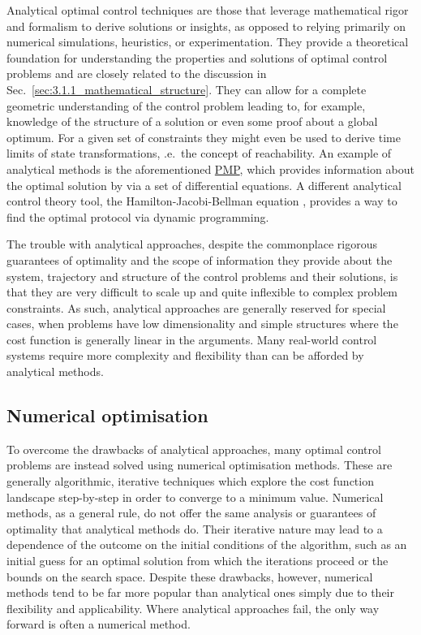 \documentclass[a4paper,oneside,11pt]{book}
\newcommand{\acrref}[1]{\hyperref[acr:#1]{#1}}
\begin{document}
Analytical optimal control techniques are those that leverage mathematical rigor and formalism to derive solutions or insights, as opposed to relying primarily on numerical simulations, heuristics, or experimentation. They provide a theoretical foundation for understanding the properties and solutions of optimal control problems and are closely related to the discussion in Sec.~\ref{sec:3.1.1_mathematical_structure}. They can allow for a complete geometric understanding of the control problem leading to, for example, knowledge of the structure of a solution or even some proof about a global optimum. For a given set of constraints they might even be used to derive time limits of state transformations, \@i.e.~the concept of reachability. An example of analytical methods is the aforementioned \acrref{PMP}, which provides information about the optimal solution by via a set of differential equations. A different analytical control theory tool, the Hamilton-Jacobi-Bellman equation \cite{yong_dynamic_1999}, provides a way to find the optimal protocol via dynamic programming\cite{sniedovich_dynamic_2010}.

The trouble with analytical approaches, despite the commonplace rigorous guarantees of optimality and the scope of information they provide about the system, trajectory and structure of the control problems and their solutions, is that they are very difficult to scale up and quite inflexible to complex problem constraints. As such, analytical approaches are generally reserved for special cases, when problems have low dimensionality and simple structures where the cost function is generally linear in the arguments. Many real-world control systems require more complexity and flexibility than can be afforded by analytical methods.

\subsection{Numerical optimisation}\label{sec:3.1.3_numerical_optimisation}

To overcome the drawbacks of analytical approaches, many optimal control problems are instead solved using numerical optimisation methods. These are generally algorithmic, iterative  techniques which explore the cost function landscape step-by-step in order to converge to a minimum value. Numerical methods, as a general rule, do not offer the same analysis or guarantees of optimality that analytical methods do. Their iterative nature may lead to a dependence of the outcome on the initial conditions of the algorithm, such as an initial guess for an optimal solution from which the iterations proceed or the bounds on the search space. Despite these drawbacks, however, numerical methods tend to be far more popular than analytical ones simply due to their flexibility and applicability. Where analytical approaches fail, the only way forward is often a numerical method.
\end{document}
